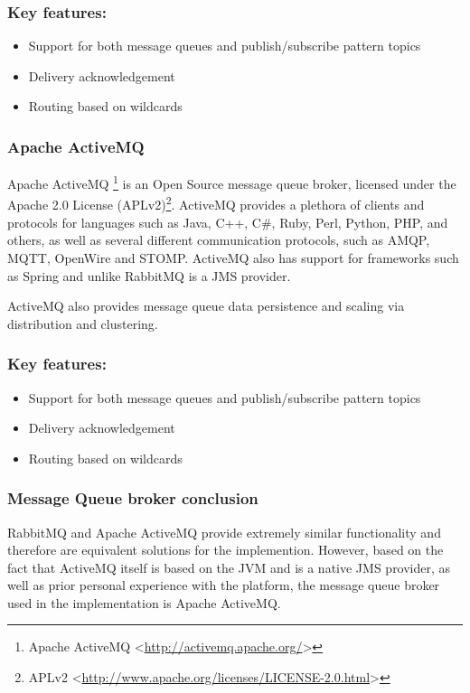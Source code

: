 \subsubsection*{Key features:}
\begin{itemize}
\item Support for both message queues and publish/subscribe pattern topics
\item Delivery acknowledgement
\item Routing based on wildcards
\end{itemize}

\subsubsection{Apache ActiveMQ}
Apache ActiveMQ \footnote{Apache ActiveMQ <\url{http://activemq.apache.org/}>} is an Open Source message queue broker, licensed under the Apache 2.0 License (APLv2)\footnote{APLv2 <\url{http://www.apache.org/licenses/LICENSE-2.0.html}>}. ActiveMQ provides a plethora of clients and protocols for languages such as Java, C++, C\#, Ruby, Perl, Python, PHP, and others\cite{activemq-devtools}, as well as several different communication protocols, such as AMQP, MQTT, OpenWire and STOMP\cite{activemq-devtools}. ActiveMQ also has support for frameworks such as Spring and unlike RabbitMQ is a JMS provider.

ActiveMQ also provides message queue data persistence and scaling via distribution and clustering.

\subsubsection*{Key features:}
\begin{itemize}
\item Support for both message queues and publish/subscribe pattern topics
\item Delivery acknowledgement
\item Routing based on wildcards
\end{itemize}

\subsubsection*{Message Queue broker conclusion}
RabbitMQ and Apache ActiveMQ provide extremely similar functionality and therefore are equivalent solutions for the implemention. However, based on the fact that ActiveMQ itself is based on the JVM and is a native JMS provider, as well as prior personal experience with the platform, the message queue broker used in the implementation is Apache ActiveMQ.

